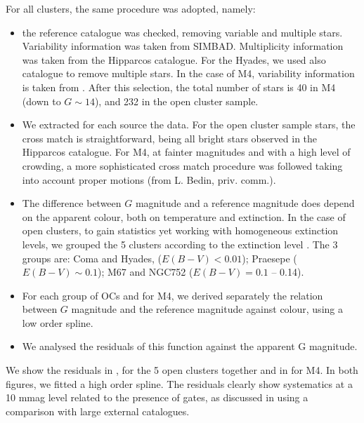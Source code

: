 \medskip
For all clusters, the same procedure was adopted, namely:
\begin{itemize}
\item the reference catalogue was checked, removing variable and multiple stars. Variability information was taken from  SIMBAD. Multiplicity information was taken from the Hipparcos catalogue. For the Hyades, we used also \cite{2016A&A...585A...7K} catalogue to remove multiple stars. In the case of M4, variability information is taken from \cite{2014MNRAS.442.2381N}. After this selection, the total number of stars is 40 in M4 (down to $G\sim 14$), and 232 in the open cluster sample.
\item We extracted for each source the {\gaia} data. For the open cluster sample stars, the cross match is straightforward, being all bright stars observed in the Hipparcos catalogue. For M4, at fainter magnitudes and with a high level of crowding, a more sophisticated cross match procedure was followed taking into account proper motions (from L. Bedin, priv. comm.).
\item The difference between $G$ magnitude and a reference magnitude does depend on the apparent colour,   both on temperature and extinction. In the case of open clusters, to gain statistics yet working with homogeneous extinction levels, we grouped the 5 clusters according to the extinction level \citep[from][]{2008AJ....136.1388T, 2007AJ....133..370T, 2007AJ....134..934T, 2006AJ....132.2453T}. The 3 groups are: Coma and Hyades, ($E(B-V)<0.01$); Praesepe ($E(B-V) \sim 0.1$); M67 and NGC752
($E(B-V) = 0.1$ -- 0.14).  
\item For each group of OCs and for M4, we derived separately the relation between $G$ magnitude and the reference magnitude against colour, using a low order spline.
\item We analysed the residuals of this function against the apparent G magnitude.
\end{itemize}

We show the residuals in , for the 5 open clusters together and in  for M4. In both figures, we fitted a high order spline. The residuals clearly show systematics at a 10 mmag level related to the presence of gates, as discussed in  using a comparison with large external catalogues.


